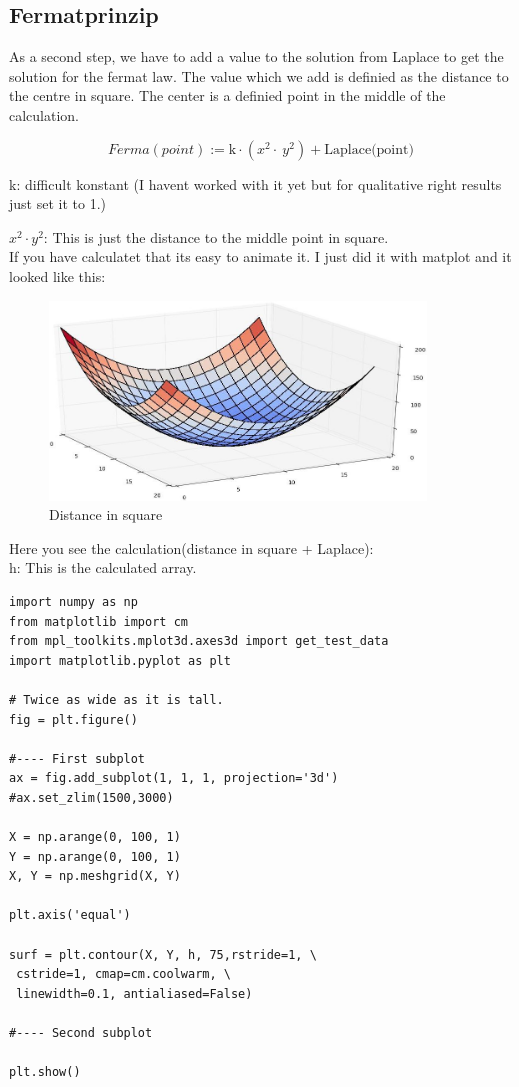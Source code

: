 \documentclass[pdftex,12pt,a4paper]{article}
\begin{document}
\subsection{Fermatprinzip}

As a second step, we have to add a value to the solution from Laplace to get the solution for the fermat law.
The value which we add is definied as the distance to the centre in square. The center is a definied point in the middle of the calculation.

\[                                                            
	Ferma(point):= \text{k}\cdot\left(x^2\cdot\ y^2\right) + \text{Laplace(point)}
\]

k: difficult konstant (I havent worked with it yet but for qualitative right results just set it to 1.)

\(x^2 \cdot y^2 \): This is just the distance to the middle point in square.
\\[3mm]
If you have calculatet that its easy to animate it. I just did it with matplot and it looked like this:

\begin{figure}[position=h]
\centering
 \caption{Distance in square}
 \includegraphics[width=10cm]{Bilder/xxyy}%
\end{figure}

\newpage

Here you see the calculation(distance in square + Laplace):
\\[0mm]
h: This is the calculated array.


\begin{lstlisting}
import numpy as np
from matplotlib import cm
from mpl_toolkits.mplot3d.axes3d import get_test_data
import matplotlib.pyplot as plt

# Twice as wide as it is tall.
fig = plt.figure()

#---- First subplot
ax = fig.add_subplot(1, 1, 1, projection='3d')
#ax.set_zlim(1500,3000)

X = np.arange(0, 100, 1)
Y = np.arange(0, 100, 1)
X, Y = np.meshgrid(X, Y)

plt.axis('equal')

surf = plt.contour(X, Y, h, 75,rstride=1, \
 cstride=1, cmap=cm.coolwarm, \
 linewidth=0.1, antialiased=False)

#---- Second subplot

plt.show()

\end{lstlisting}
\end{document}
